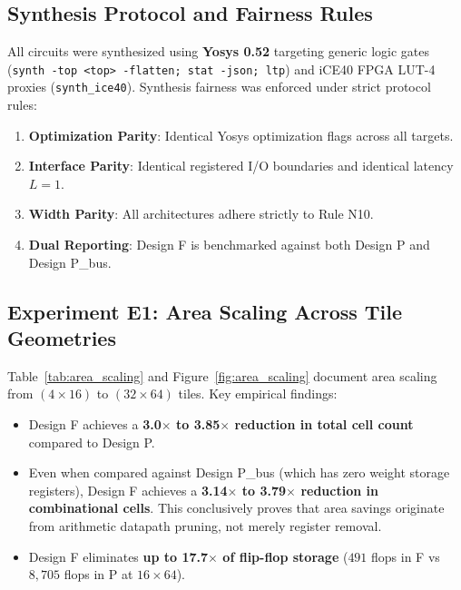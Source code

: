 \documentclass[11pt,a4paper]{article}
\begin{document}
\subsection{Synthesis Protocol and Fairness Rules}
All circuits were synthesized using \textbf{Yosys 0.52} targeting generic logic gates (\texttt{synth -top <top> -flatten; stat -json; ltp}) and iCE40 FPGA LUT-4 proxies (\texttt{synth\_ice40}). Synthesis fairness was enforced under strict protocol rules:
\begin{enumerate}
    \item \textbf{Optimization Parity}: Identical Yosys optimization flags across all targets.
    \item \textbf{Interface Parity}: Identical registered I/O boundaries and identical latency $L=1$.
    \item \textbf{Width Parity}: All architectures adhere strictly to Rule N10.
    \item \textbf{Dual Reporting}: Design F is benchmarked against both Design P and Design P\_bus.
\end{enumerate}

\subsection{Experiment E1: Area Scaling Across Tile Geometries}
Table~\ref{tab:area_scaling} and Figure~\ref{fig:area_scaling} document area scaling from $(4 \times 16)$ to $(32 \times 64)$ tiles. Key empirical findings:
\begin{itemize}
    \item Design F achieves a \textbf{3.0$\times$ to 3.85$\times$ reduction in total cell count} compared to Design P.
    \item Even when compared against Design P\_bus (which has zero weight storage registers), Design F achieves a \textbf{3.14$\times$ to 3.79$\times$ reduction in combinational cells}. This conclusively proves that area savings originate from arithmetic datapath pruning, not merely register removal.
    \item Design F eliminates \textbf{up to 17.7$\times$ of flip-flop storage} ($491$ flops in F vs $8{,}705$ flops in P at $16 \times 64$).
\end{itemize}
\end{document}
